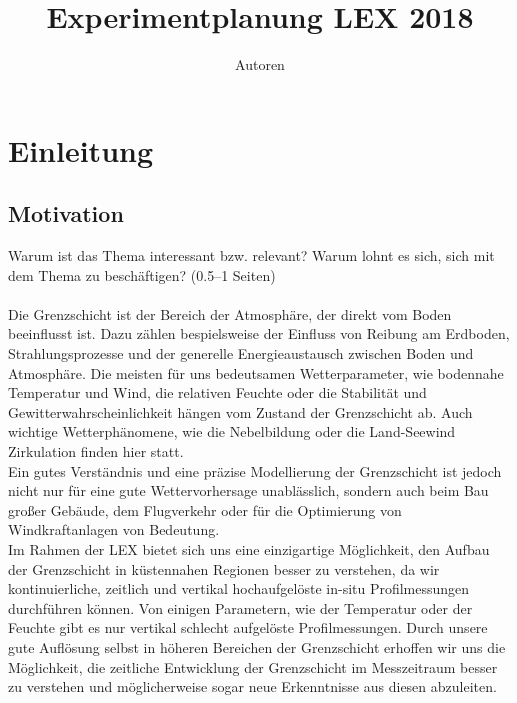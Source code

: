 \documentclass[a4paper,11pt,DIV=calc,tablecaptionabove,headinclude,twoside]{article}
\title{Experimentplanung LEX 2018}%
\author{Autoren}
\begin{document}
\maketitle



\section{Einleitung}
\subsection{Motivation}
Warum ist das Thema interessant bzw. relevant? Warum lohnt es sich, sich mit dem Thema zu beschäftigen? (0.5--1 Seiten)\\\\
Die Grenzschicht ist der Bereich der Atmosphäre, der direkt vom Boden beeinflusst ist. Dazu zählen bespielsweise der Einfluss von Reibung am Erdboden, Strahlungsprozesse und der generelle Energieaustausch zwischen Boden und Atmosphäre. Die meisten für uns bedeutsamen Wetterparameter, wie bodennahe Temperatur und Wind, die relativen Feuchte oder die Stabilität und Gewitterwahrscheinlichkeit hängen vom Zustand der Grenzschicht ab. Auch wichtige Wetterphänomene, wie die Nebelbildung oder die Land-Seewind Zirkulation finden hier statt.\\
Ein gutes Verständnis und eine präzise Modellierung der Grenzschicht ist jedoch nicht nur für eine gute Wettervorhersage unablässlich, sondern auch beim Bau großer Gebäude, dem Flugverkehr oder für die Optimierung von Windkraftanlagen von Bedeutung.\\
Im Rahmen der LEX bietet sich uns eine einzigartige Möglichkeit, den Aufbau der Grenzschicht in küstennahen Regionen besser zu verstehen, da wir kontinuierliche, zeitlich und vertikal hochaufgelöste in-situ Profilmessungen durchführen können. Von einigen Parametern, wie der Temperatur oder der Feuchte gibt es nur vertikal schlecht aufgelöste Profilmessungen. Durch unsere gute Auflösung selbst in höheren Bereichen der Grenzschicht erhoffen wir uns die Möglichkeit, die zeitliche Entwicklung der Grenzschicht im Messzeitraum besser zu verstehen und möglicherweise sogar neue Erkenntnisse aus diesen abzuleiten.
	
\end{document}
